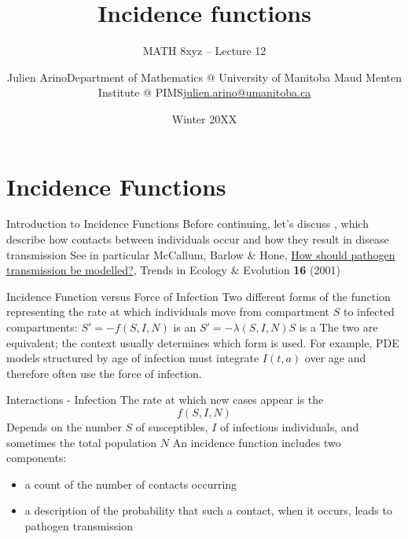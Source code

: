 \documentclass[aspectratio=169]{beamer}\usepackage[]{graphicx}\usepackage[]{xcolor}
\title{Incidence functions}
\subtitle{MATH 8xyz -- Lecture 12}
\author{\texorpdfstring{Julien Arino\newline Department of Mathematics @ University of Manitoba \newline Maud Menten Institute @ PIMS\newline\url{julien.arino@umanitoba.ca}}{Julien Arino}}
\date{Winter 20XX}
\begin{document}


\section{Incidence Functions}

\begin{frame}{Introduction to Incidence Functions}
\bbullet Before continuing, let's discuss , which describe how contacts between individuals occur and how they result in disease transmission
\vfill
\bbullet See in particular McCallum, Barlow \& Hone, \href{https://doi.org/10.1016/S0169-5347(01)02144-9}{How should pathogen transmission be modelled?}, Trends in Ecology \& Evolution \textbf{16} (2001)
\nocite{mccallum2001should}
\end{frame}

\begin{frame}{Incidence Function versus Force of Infection}
\bbullet Two different forms of the function representing the rate at which individuals move from compartment $S$ to infected compartments:
\vfill
\bbullet $S'=-f(S,I,N)$ is an 
\vfill
\bbullet $S'=-\lambda(S,I,N)S$ is a 
\vfill
\bbullet The two are equivalent; the context usually determines which form is used. For example, PDE models structured by age of infection must integrate $I(t,a)$ over age and therefore often use the force of infection.
\end{frame}

\begin{frame}{Interactions - Infection}
\bbullet The rate at which new cases appear is the 
\begin{equation}
\tag{1}
f(S,I,N)
\end{equation}
\bbullet Depends on the number $S$ of susceptibles, $I$ of infectious individuals, and sometimes the total population $N$
\vfill
\bbullet An incidence function includes two components:
\begin{itemize}
  \item a count of the number of contacts occurring
  \item a description of the probability that such a contact, when it occurs, leads to pathogen transmission
\end{itemize}
\end{frame}
\end{document}
